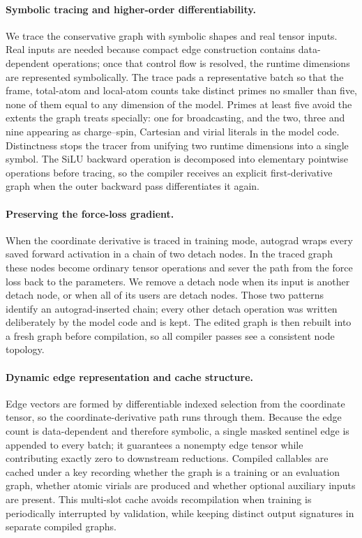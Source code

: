 \paragraph{Symbolic tracing and higher-order differentiability.}
We trace the conservative graph with symbolic shapes and real tensor inputs.
Real inputs are needed because compact edge construction contains data-dependent operations; once that control flow is resolved, the runtime dimensions are represented symbolically.
The trace pads a representative batch so that the frame, total-atom and local-atom counts take distinct primes no smaller than five, none of them equal to any dimension of the model.
Primes at least five avoid the extents the graph treats specially: one for broadcasting, and the two, three and nine appearing as charge--spin, Cartesian and virial literals in the model code.
Distinctness stops the tracer from unifying two runtime dimensions into a single symbol.
The SiLU backward operation is decomposed into elementary pointwise operations before tracing, so the compiler receives an explicit first-derivative graph when the outer backward pass differentiates it again.

\paragraph{Preserving the force-loss gradient.}
When the coordinate derivative is traced in training mode, autograd wraps every saved forward activation in a chain of two detach nodes.
In the traced graph these nodes become ordinary tensor operations and sever the path from the force loss back to the parameters.
We remove a detach node when its input is another detach node, or when all of its users are detach nodes.
Those two patterns identify an autograd-inserted chain; every other detach operation was written deliberately by the model code and is kept.
The edited graph is then rebuilt into a fresh graph before compilation, so all compiler passes see a consistent node topology.

\paragraph{Dynamic edge representation and cache structure.}
Edge vectors are formed by differentiable indexed selection from the coordinate tensor, so the coordinate-derivative path runs through them.
Because the edge count is data-dependent and therefore symbolic, a single masked sentinel edge is appended to every batch; it guarantees a nonempty edge tensor while contributing exactly zero to downstream reductions.
Compiled callables are cached under a key recording whether the graph is a training or an evaluation graph, whether atomic virials are produced and whether optional auxiliary inputs are present.
This multi-slot cache avoids recompilation when training is periodically interrupted by validation, while keeping distinct output signatures in separate compiled graphs.

